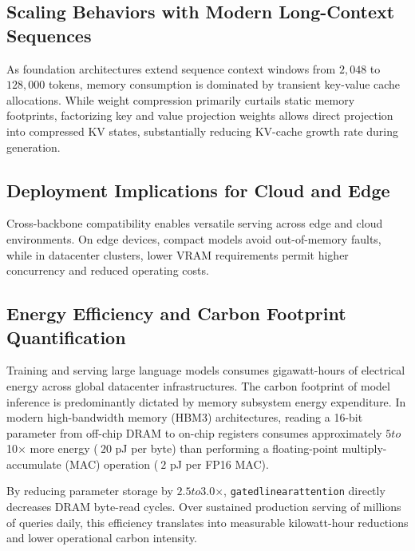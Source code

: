 \subsection{Scaling Behaviors with Modern Long-Context Sequences}
As foundation architectures extend sequence context windows from $2{,}048$ to $128{,}000$ tokens, memory consumption is dominated by transient key-value cache allocations. While weight compression primarily curtails static memory footprints, factorizing key and value projection weights allows direct projection into compressed KV states, substantially reducing KV-cache growth rate during generation.

\subsection{Deployment Implications for Cloud and Edge}
Cross-backbone compatibility enables versatile serving across edge and cloud environments. On edge devices, compact models avoid out-of-memory faults, while in datacenter clusters, lower VRAM requirements permit higher concurrency and reduced operating costs.

\subsection{Energy Efficiency and Carbon Footprint Quantification}
Training and serving large language models consumes gigawatt-hours of electrical energy across global datacenter infrastructures. The carbon footprint of model inference is predominantly dictated by memory subsystem energy expenditure. In modern high-bandwidth memory (HBM3) architectures, reading a 16-bit parameter from off-chip DRAM to on-chip registers consumes approximately $5$\times$ to $10$\times$ more energy ($~20$ pJ per byte) than performing a floating-point multiply-accumulate (MAC) operation ($~2$ pJ per FP16 MAC).

By reducing parameter storage by $2.5$\times$ to $3.0$\times$, \texttt{gatedlinearattention} directly decreases DRAM byte-read cycles. Over sustained production serving of millions of queries daily, this efficiency translates into measurable kilowatt-hour reductions and lower operational carbon intensity.
